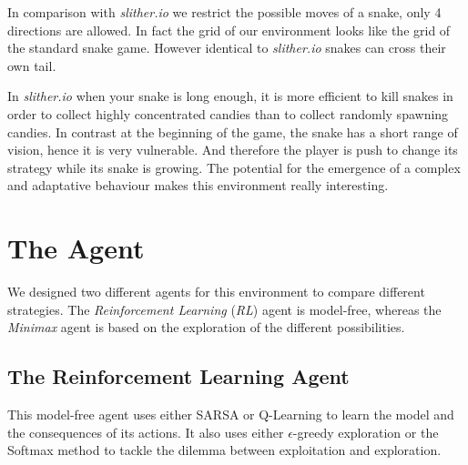 \documentclass[journal, a4paper]{IEEEtran}
\begin{document}
In comparison with \emph{slither.io} we restrict the possible moves of a snake, only 4 directions are allowed. In fact the grid of our environment looks like the grid of the standard snake game. However identical to \emph{slither.io} snakes can cross their own tail.

In \emph{slither.io} when your snake is long enough, it is more efficient to kill snakes in order to collect highly concentrated candies than to collect randomly spawning candies. In contrast at the beginning of the game, the snake has a short range of vision, hence it is very vulnerable. And therefore the player is push to change its strategy while its snake is growing. The potential for the emergence of a complex and adaptative behaviour makes this environment really interesting.

\section{The Agent}

We designed two different agents for this environment to compare different strategies.
The \emph{Reinforcement Learning} (\emph{RL}) agent is model-free, whereas the \emph{Minimax} agent is based on the exploration of the different possibilities.

\subsection{The Reinforcement Learning Agent\label{rl_agent}}

This model-free agent uses either SARSA or Q-Learning to learn the model and the consequences of its actions.
It also uses either $\epsilon$-greedy exploration or the Softmax method to tackle the dilemma between exploitation and exploration.
\end{document}
